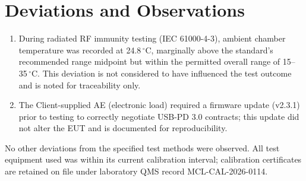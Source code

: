 \section{Deviations and Observations}
\begin{enumerate}[label=\textbf{Note \arabic*.}]
\item During radiated RF immunity testing (IEC 61000-4-3), ambient chamber temperature was recorded at 24.8\,$^{\circ}$C, marginally above the standard's recommended range midpoint but within the permitted overall range of 15--35\,$^{\circ}$C. This deviation is not considered to have influenced the test outcome and is noted for traceability only.
\item The Client-supplied AE (electronic load) required a firmware update (v2.3.1) prior to testing to correctly negotiate USB-PD 3.0 contracts; this update did not alter the EUT and is documented for reproducibility.
\end{enumerate}
No other deviations from the specified test methods were observed. All test equipment used was within its current calibration interval; calibration certificates are retained on file under laboratory QMS record MCL-CAL-2026-0114.

